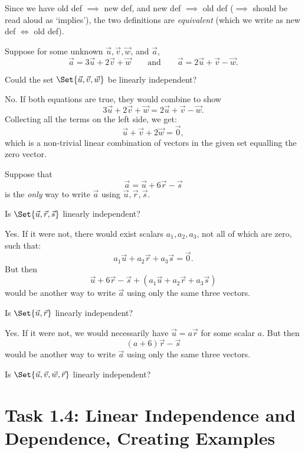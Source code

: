 \documentclass{problemset}
\begin{document}
	Since we have old def $\implies$ new def, and new def $\implies$ old def 
	($\implies$ should be read aloud as `implies'), the two definitions
	are \emph{equivalent} (which we write as new def $\iff$ old def).


	\question
	Suppose for some unknown $\vec u, \vec v, \vec w$, and $\vec a$,
	\[
		\vec a = 3\vec u+2\vec v +\vec w\qquad \text{and}\qquad 
		\vec a = 2\vec u+\vec v -\vec w.
	\]
	\begin{parts}
		\item Could the set $\Set{\vec u,\vec v,\vec w}$ be linearly
		independent?
			\begin{solution}
				No. If both equations are true, they would combine to show
				\[
					3\vec u+2\vec v +\vec w = 2\vec u+\vec v -\vec w.
				\]
				Collecting all the terms on the left side, we get:
				\[
					\vec u + \vec v + 2\vec w = \vec 0,
				\]
				which is a non-trivial linear combination of vectors in the given
				set equalling the zero vector.
			\end{solution}
	\end{parts}
	Suppose that
	\[
		\vec a = \vec u+6\vec r-\vec s
	\]
	is the \emph{only} way to write $\vec a$ using $\vec u,\vec r,\vec s$.
	\begin{parts}[resume]
		\item Is $\Set{\vec u,\vec r,\vec s}$ linearly independent?
			\begin{solution}
				Yes. If it were not, there would exist scalars $a_1, a_2, a_3$, 
				not all of which are zero, such that:
				\[
					a_1 \vec u + a_2 \vec r + a_3\vec s = \vec 0.
				\]
				But then 
				\[
					\vec u+6\vec r-\vec s + (a_1 \vec u + a_2 \vec r + a_3\vec s)
				\]
				would be another way to write $\vec a$ using only the same three
				vectors. 
			\end{solution}
		\item Is $\Set{\vec u,\vec r}$ linearly independent?
			\begin{solution}
				Yes. If it were not, we would necessarily have $\vec u = a \vec r$
				for some scalar $a$. But then 
				\[
					(a + 6) \vec r - \vec s
				\]
				would be another way to write $\vec a$ using only the same three
				vectors. 
			\end{solution}
		\item Is $\Set{\vec u,\vec v,\vec w,\vec r}$ linearly independent?
	\end{parts}


\newpage
\pagestyle{iola}
\section*{Task 1.4: Linear Independence and Dependence, Creating Examples}
\end{document}
